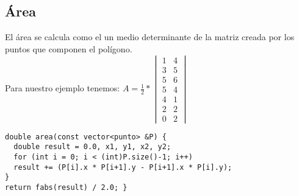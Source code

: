\subsection{Área}
El área se calcula como el un medio determinante de la matriz creada por los puntos que componen el polígono.\\
Para nuestro ejemplo tenemos:
$A=\frac{1}{2}*\begin{vmatrix}
 1 & 4\\
 3 & 5\\
 5 & 6\\
 5 & 4\\
 4 & 1\\
 2 & 2\\
 0 & 2
 \end{vmatrix}$
 \\
\begin{minipage}{\textwidth}
\begin{lstlisting}[style=C]
double area(const vector<punto> &P) {
  double result = 0.0, x1, y1, x2, y2;
  for (int i = 0; i < (int)P.size()-1; i++)
  result += (P[i].x * P[i+1].y - P[i+1].x * P[i].y);
}
return fabs(result) / 2.0; }
\end{lstlisting}
\end{minipage}
